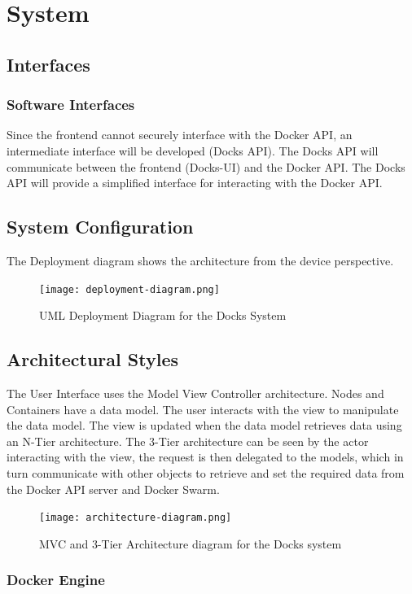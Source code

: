\documentclass[]{article}
\begin{document}
\section{System}
\subsection{Interfaces}
\subsubsection{Software Interfaces}
Since the frontend cannot securely interface with the Docker API,
an intermediate interface will be developed (Docks API).
The Docks API will communicate between the frontend (Docks-UI) and
the Docker API. The Docks API will provide a simplified interface for
interacting with the Docker API.


\subsection{System Configuration}
The Deployment diagram shows the architecture from the device perspective.

\begin{figure}[H]
	\centering
	\texttt{[image: deployment-diagram.png]}
	\caption{UML Deployment Diagram for the Docks System}
\end{figure}

\subsection{Architectural Styles}

The User Interface uses the Model View Controller architecture.
Nodes and Containers have a data model.
The user interacts with the view to manipulate the data model.
The view is updated when the data model retrieves data using an N-Tier architecture.
The 3-Tier architecture can be seen by the actor interacting with the view,
the request is then delegated to the models, which in turn
communicate with other objects to retrieve and set the required data from
the Docker API server and Docker Swarm.

\begin{figure}[H]
	\centering
	\texttt{[image: architecture-diagram.png]}
	\caption{MVC and 3-Tier Architecture diagram for the Docks system}
\end{figure}

\subsubsection{Docker Engine}
\end{document}
